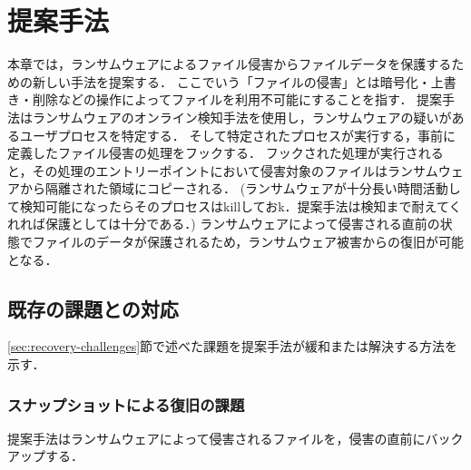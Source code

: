 \chapter{提案手法}
本章では，ランサムウェアによるファイル侵害からファイルデータを保護するための新しい手法を提案する．
ここでいう「ファイルの侵害」とは暗号化・上書き・削除などの操作によってファイルを利用不可能にすることを指す．
提案手法はランサムウェアのオンライン検知手法を使用し，ランサムウェアの疑いがあるユーザプロセスを特定する．
そして特定されたプロセスが実行する，事前に定義したファイル侵害の処理をフックする．
フックされた処理が実行されると，その処理のエントリーポイントにおいて侵害対象のファイルはランサムウェアから隔離された領域にコピーされる．
(ランサムウェアが十分長い時間活動して検知可能になったらそのプロセスはkillしておk．提案手法は検知まで耐えてくれれば保護としては十分である．)
ランサムウェアによって侵害される直前の状態でファイルのデータが保護されるため，ランサムウェア被害からの復旧が可能となる．


\section{既存の課題との対応}
\ref{sec:recovery-challenges}節で述べた課題を提案手法が緩和または解決する方法を示す．
\subsection{スナップショットによる復旧の課題}
提案手法はランサムウェアによって侵害されるファイルを，侵害の直前にバックアップする．


